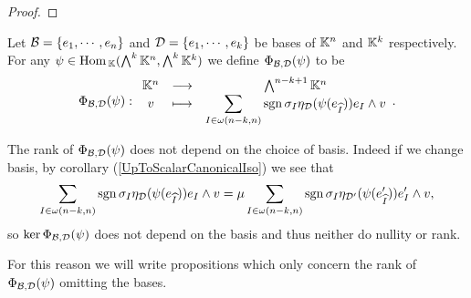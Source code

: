 \begin{proof}
\end{proof}

\begin{definition}
Let $\mathcal{B}=\left\{{e_1,\cdots, e_n}\right\}$ and $\mathcal{D}=\left\{{e_1,\cdots, e_k}\right\}$ be bases of $\mathbb{K}^n$ and $\mathbb{K}^k$ respectively. For any $\psi\in \mathrm{Hom}\,_{\mathbb{K}}(\bigwedge^k\mathbb{K}^n,\bigwedge^k\mathbb{K}^k)$ we define $\Phi_{\mathcal{B},\mathcal{D}}(\psi)$ to be
\[\Phi_{\mathcal{B},\mathcal{D}}(\psi):\begin{array}{ccc} {\mathbb{K}^n} & \longrightarrow & {\bigwedge^{n-k+1}\mathbb{K}^n}\\ {v} & \longmapsto & {\displaystyle\sum_{I\in \omega(n-k,n)}\mathrm{sgn}\,\sigma_I\eta_{\mathcal{D}}(\psi(e_{\widehat{I}}))e_I\wedge v} \end{array}.\]
\end{definition}

\begin{remark}\label{RankPhiIsBaseIndependent}
The rank of $\Phi_{\mathcal{B},\mathcal{D}}(\psi)$ does not depend on the choice of basis. Indeed if we change basis, by corollary (\ref{UpToScalarCanonicalIso}) we see that
\[\sum_{I\in \omega(n-k,n)}\mathrm{sgn}\,\sigma_I\eta_{\mathcal{D}}(\psi(e_{\widehat{I}}))e_I\wedge v=\mu\sum_{I\in \omega(n-k,n)}\mathrm{sgn}\,\sigma_I\eta_{\mathcal{D}'}(\psi(e'_{\widehat{I}}))e'_I\wedge v,\]
so $\ker \Phi_{\mathcal{B},\mathcal{D}}(\psi)$ does not depend on the basis and thus neither do nullity or rank.\bigskip

For this reason we will write propositions which only concern the rank of $\Phi_{\mathcal{B},\mathcal{D}}(\psi)$ omitting the bases.
\end{remark}

